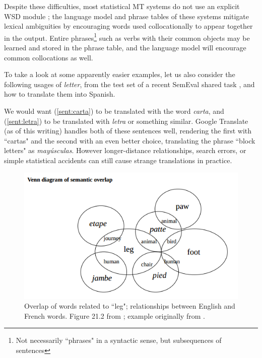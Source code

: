 Despite these difficulties, most statistical MT systems do not use an explicit
WSD module \cite{wsdchap3}; the language model and phrase tables of these
systems mitigate lexical ambiguities by encouraging words used collocationally
to appear together in the output. Entire phrases\footnote{Not necessarily
``phrases" in a syntactic sense, but subsequences of sentences} such as verbs
with their common objects may be learned and stored in the phrase table, and
the language model will encourage common collocations as well.

To take a look at some apparently easier examples, let us also consider the
following usages of \emph{letter}, from the test set of a recent SemEval shared
task \cite{task10}, and how to translate them into Spanish.

\label{sent:carta}
\label{sent:letra}

We would want (\ref{sent:carta}) to be translated with the word \emph{carta},
and (\ref{sent:letra}) to be translated with \emph{letra} or something similar.
Google Translate (as of this writing) handles both of these sentences well,
rendering the first with ``cartas" and the second with an even better choice,
translating the phrase ``block letters" as \emph{mayúsculas}.
However longer-distance relationships, search errors, or simple statistical
accidents can still cause strange translations in practice.

\begin{figure}
  \includegraphics[width=12cm]{hutchins-leg-etc.png}
  \caption{Overlap of words related to ``leg"; relationships between English
  and French words. Figure 21.2 from \protect\cite{slp1}; example originally
  from \protect\cite[Chapter 6]{hutchins1992introduction}.}
  \label{fig:leg}
\end{figure}


